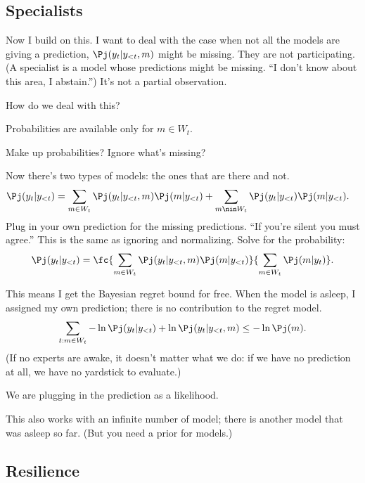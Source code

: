 \subsection{Specialists}



Now I build on this. I want to deal with the case when not all the models are giving a prediction, $\Pj(y_t|y_{<t},m)$ might be missing. They are not participating. %
(A specialist is a model whose predictions might be missing. ``I don't know about this area, I abstain.'') 
It's not a partial observation.

How do we deal with this? 

Probabilities are available only for $m \in W_t$.

Make up probabilities? Ignore what's missing?


Now there's two types of models: the ones that are there and not.
\begin{align}
\Pj(y_t|y_{<t}) &= 
\sum_{m\in W_t}
\Pj(y_t| y_{<t},m) \Pj(m|y_{<t})
+ \sum_{m\nin W_t} 
\Pj(y_t|y_{<t}) \Pj(m|y_{<t}).
\end{align}
Plug in your own prediction for the missing predictions.
``If you're silent you must agree.'' This is the same as ignoring and normalizing.
Solve for the probability:
$$
\Pj(y_t|y_{<t}) = \fc{\sum_{m\in W_t}\Pj(y_t|y_{<t}, m) \Pj(m|y_{<t})}{\sum_{m\in W_t} \Pj(m|y_t)}.
$$

This means I get the Bayesian regret bound for free.
When the model is asleep, I assigned my own prediction; there is no contribution to the regret model.
$$
\sum_{t: m\in W_t} -\ln \Pj(y_t|y_{<t}) + \ln \Pj(y_t|y_{<t}, m) \le -\ln \Pj(m).
$$
(If no experts are awake, it doesn't matter what we do: if we have no prediction at all, we have no yardstick to evaluate.)

We are plugging in the prediction as a likelihood.


This also works with an infinite number of model; there is another model that was asleep so far. (But you need a prior for models.)


\subsection{Resilience}

